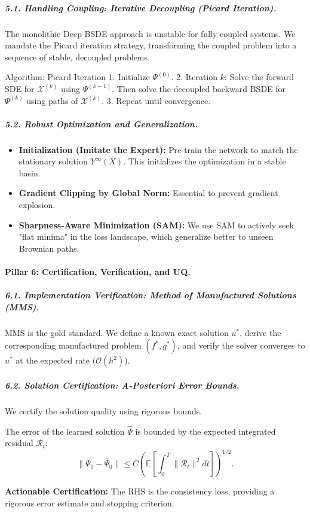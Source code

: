 \subparagraph{5.1. Handling Coupling: Iterative Decoupling (Picard Iteration).}
The monolithic Deep BSDE approach is unstable for fully coupled systems. We mandate the Picard iteration strategy, transforming the coupled problem into a sequence of stable, decoupled problems.

\begin{distillmethod}{Algorithm: Picard Iteration}
1. Initialize $\Psi^{(0)}$.
2. Iteration $k$: Solve the forward SDE for $\mathcal{X}^{(k)}$ using $\Psi^{(k-1)}$. Then solve the decoupled backward BSDE for $\Psi^{(k)}$ using paths of $\mathcal{X}^{(k)}$.
3. Repeat until convergence.
\end{distillmethod}

\subparagraph{5.2. Robust Optimization and Generalization.}
\begin{itemize}
    \item \textbf{Initialization (Imitate the Expert):} Pre-train the network to match the stationary solution $Y^\infty(X)$. This initializes the optimization in a stable basin.
    \item \textbf{Gradient Clipping by Global Norm:} Essential to prevent gradient explosion.
    \item \textbf{Sharpness-Aware Minimization (SAM):} We use SAM \cite{ForetEtAl2021} to actively seek "flat minima" in the loss landscape, which generalize better to unseen Brownian paths.
\end{itemize}

\paragraph{Pillar 6: Certification, Verification, and UQ.}

\subparagraph{6.1. Implementation Verification: Method of Manufactured Solutions (MMS).}
MMS is the gold standard. We define a known exact solution $u^*$, derive the corresponding manufactured problem $(f^*, g^*)$, and verify the solver converges to $u^*$ at the expected rate ($\mathcal{O}(h^2)$).

\subparagraph{6.2. Solution Certification: A-Posteriori Error Bounds.}
We certify the solution quality using rigorous bounds.

\begin{theorem}
The error of the learned solution $\hat{\Psi}$ is bounded by the expected integrated residual $\mathcal{R}_t$:
\[
\|\Psi_0 - \hat{\Psi}_0\| \le C \left( \mathbb{E}\left[\int_0^T \|\mathcal{R}_t\|^2 dt\right] \right)^{1/2}.
\]
\end{theorem}
\textbf{Actionable Certification:} The RHS is the consistency loss, providing a rigorous error estimate and stopping criterion.

